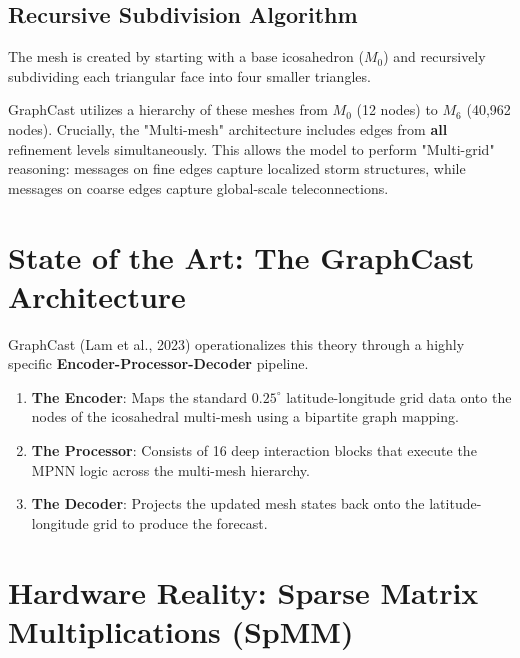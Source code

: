 \subsection{Recursive Subdivision Algorithm}
The mesh is created by starting with a base icosahedron ($M_0$) and recursively subdividing each triangular face into four smaller triangles. 

\begin{algorithm}[H]
\caption{Icosahedral Subdivision Pseudo-code}
\SetAlgoLined
{}
\;
\end{algorithm}

GraphCast utilizes a hierarchy of these meshes from $M_0$ (12 nodes) to $M_6$ (40,962 nodes). Crucially, the "Multi-mesh" architecture includes edges from \textbf{all} refinement levels simultaneously. This allows the model to perform "Multi-grid" reasoning: messages on fine edges capture localized storm structures, while messages on coarse edges capture global-scale teleconnections.

\section{State of the Art: The GraphCast Architecture}

GraphCast (Lam et al., 2023) operationalizes this theory through a highly specific \textbf{Encoder-Processor-Decoder} pipeline.

\begin{enumerate}
    \item \textbf{The Encoder}: Maps the standard $0.25^\circ$ latitude-longitude grid data onto the nodes of the icosahedral multi-mesh using a bipartite graph mapping.
    \item \textbf{The Processor}: Consists of 16 deep interaction blocks that execute the MPNN logic across the multi-mesh hierarchy.
    \item \textbf{The Decoder}: Projects the updated mesh states back onto the latitude-longitude grid to produce the forecast.
\end{enumerate}

\section{Hardware Reality: Sparse Matrix Multiplications (SpMM)}


